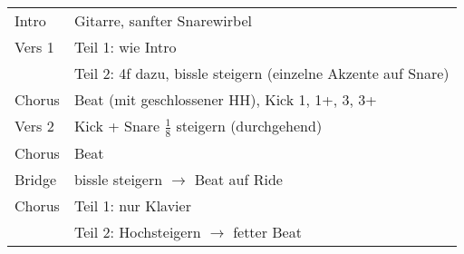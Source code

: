 
\begin{tabular}{p{1.6cm}l}
	Intro  & Gitarre, sanfter Snarewirbel                                  \\
	Vers 1 & Teil 1: wie Intro                                             \\
	       & Teil 2: 4f dazu, bissle steigern (einzelne Akzente auf Snare) \\
	Chorus & Beat (mit geschlossener HH), Kick 1, 1+, 3, 3+                \\
	Vers 2 & Kick + Snare $\frac{1}{8}$ steigern (durchgehend)             \\
	Chorus & Beat                                                          \\
	Bridge & bissle steigern $\rightarrow$ Beat auf Ride                   \\
	Chorus & Teil 1: nur Klavier                                           \\
	       & Teil 2: Hochsteigern $\rightarrow$ fetter Beat                \\
\end{tabular}
